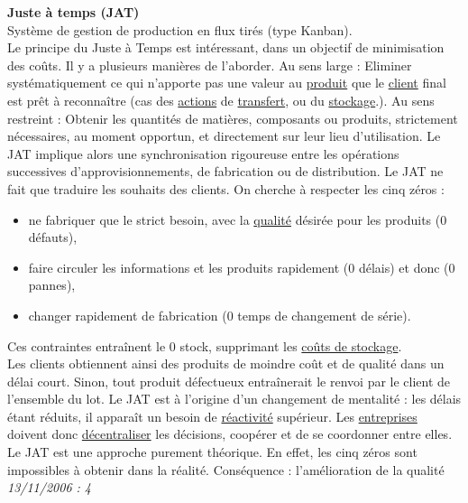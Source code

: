 \documentclass[12pt,a4paper]{article}
\newcommand{\fontlignedroite}[1]{%
    \textsf{\Large{\textbf{#1}}}
}
\newlength{\largeurtitre}
\newlength{\largeurligne}
\newcommand{\lignedroite}[1]{%
    \setlength{\largeurtitre}{0pt}
    \setlength{\largeurligne}{0pt}
    \settowidth{\largeurtitre}{\fontlignedroite{#1}}
    \addtolength{\largeurligne}{\textwidth}
    \addtolength{\largeurligne}{-\largeurtitre}
    \addtolength{\largeurligne}{-4pt}
    \bigskip
    \fontlignedroite{#1} \raisebox{0.3em}{\vrule depth 0pt height 0.6pt width
	\largeurligne}%
}
\newcommand{\lignegauche}[1]{%
    \setlength{\largeurtitre}{0pt}
    \setlength{\largeurligne}{0pt}
    \settowidth{\largeurtitre}{\fontlignedroite{#1}}
    \addtolength{\largeurligne}{\textwidth}
    \addtolength{\largeurligne}{-\largeurtitre}
    \addtolength{\largeurligne}{-4pt}
    \bigskip
    \raisebox{0.3em}{\vrule depth 0pt height 0.6pt width \largeurligne} #1%
}
\newcommand{\definition}[3]{
	\begin{minipage}{\textwidth}
		\lignedroite{#1}\\
		#2\\
	\ifthenelse{\isempty{#3}}%
	    {\raisebox{0.3em}{\vrule depth 0pt height 0.6pt width \textwidth}}%
	    {\lignegauche{\footnotesize \textit{#3}}}%
    \end{minipage}
    \\\\
}
\begin{document}
\definition{Juste à temps (JAT)}
{
	Système de gestion de production en flux tirés (type Kanban).\\
	Le principe du Juste à Temps est intéressant, dans un objectif de minimisation des coûts. Il y a plusieurs manières de l'aborder.
	Au sens large : Eliminer systématiquement ce qui n'apporte pas une valeur au \href{http://gpr.insa-lyon.fr/supgedem/Home/Le_monde_industriel/L_entreprise/L_etude_industrialisation/leproduit.htm}{produit} que le \href{http://gpr.insa-lyon.fr/supgedem/Home/glossaire/gLESCLIENTS.htm}{client} final est prêt à reconnaître (cas des \href{http://gpr.insa-lyon.fr/supgedem/Home/glossaire/gLeSACTIONS.htm}{actions} de \href{http://gpr.insa-lyon.fr/supgedem/Home/glossaire/gLetransfert.htm}{transfert}, ou du \href{http://gpr.insa-lyon.fr/supgedem/Home/glossaire/gLestock.htm}{stockage}.).
	Au sens restreint : Obtenir les quantités de matières, composants ou produits, strictement nécessaires, au moment opportun, et directement sur leur lieu d'utilisation. Le JAT implique alors une synchronisation rigoureuse entre les opérations successives d'approvisionnements, de fabrication ou de distribution.
	Le JAT ne fait que traduire les souhaits des clients. On cherche à respecter les cinq zéros :
	\begin{itemize}
	\item ne fabriquer que le strict besoin, avec la \href{http://gpr.insa-lyon.fr/supgedem/Home/glossaire/gLaqualite.htm}{qualité} désirée pour les produits (0 défauts),
	\item faire circuler les informations et les produits rapidement (0 délais) et donc (0 pannes),
	\item changer rapidement de fabrication (0 temps de changement de série).
	\end{itemize}
	Ces contraintes entraînent le 0 stock, supprimant les \href{http://gpr.insa-lyon.fr/supgedem/Home/glossaire/glescouts.htm}{coûts de stockage}.\\
	Les clients obtiennent ainsi des produits de moindre coût et de qualité dans un délai court. Sinon, tout produit défectueux entraînerait le renvoi par le client de l'ensemble du lot.
	Le JAT est à l'origine d'un changement de mentalité : les délais étant réduits, il apparaît un besoin de \href{http://gpr.insa-lyon.fr/supgedem/Home/glossaire/glareactivite.htm}{réactivité} supérieur. Les \href{http://gpr.insa-lyon.fr/supgedem/Home/Le_monde_industriel/L_entreprise/lentreprise.htm}{entreprises} doivent donc \href{http://gpr.insa-lyon.fr/supgedem/Home/glossaire/gLadecentralisation.htm}{décentraliser} les décisions, coopérer et de se coordonner entre elles.
	Le JAT est une approche purement théorique. En effet, les cinq zéros sont impossibles à obtenir dans la réalité.
	Conséquence : l'amélioration de la qualité
	}{13/11/2006 : 4}
		
\end{document}
